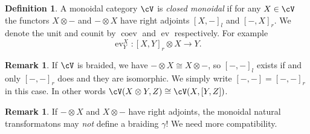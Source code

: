 \documentclass[a4paper,11pt,oneside,openany]{scrbook}
\newcommand{\from}{\colon}
\newcommand{\iso}{\cong}
\DeclareMathOperator{\coev}{coev}
\DeclareMathOperator{\ev}{ev}
\theoremstyle{definition}
\theoremstyle{definition}
\newtheorem{defn}[thm]{Definition} %
\newtheorem{rmk}[thm]{Remark}
\begin{document}
\begin{defn}
    A monoidal category $ \cV $ is \emph{closed monoidal} if for any $ X \in \cV $ the functors $ X\otimes - $ and $ -\otimes X $ have right adjoints $ [X,-]_l $ and $ [-,X]_r $.
    We denote the unit and counit by $ \coev $ and $ \ev $ respectively.
    For example
    \begin{displaymath}
	\ev^X_Y \from [X,Y]_r \otimes X \rightarrow Y.
    \end{displaymath}
\end{defn}
\begin{rmk}
    If $ \cV $ is braided, we have $ -\otimes X \iso X\otimes - $, so $ [-,-]_l $ exists if and only $ [-,-]_r $ does and they are isomorphic.
    We simply write $ [-,-] = [-,-]_r $ in this case.
    In other words $ \cV(X\otimes Y,Z)\iso \cV(X,[Y,Z]) $.
\end{rmk}

\begin{rmk}
    If $ -\otimes X $ and $ X\otimes - $ have right adjoints, the monoidal natural transformatons may \emph{not} define a braiding $ \gamma $!
    We need more compatibility.
\end{rmk}
\end{document}
